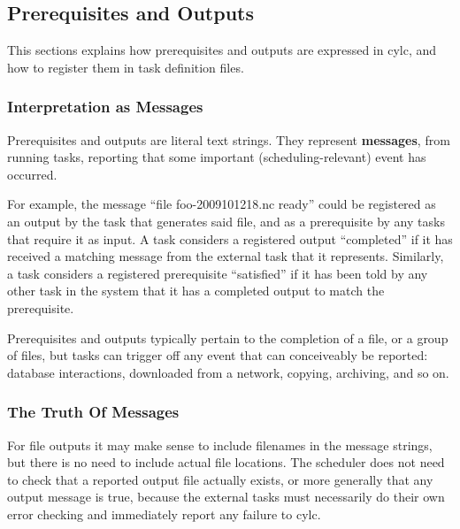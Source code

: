 \documentclass[11pt,a4paper]{article}
\begin{document}
\label{sec:requisites}
\subsection{Prerequisites and Outputs}


This sections explains how prerequisites and outputs are expressed in
cylc, and how to register them in task definition files.

\label{sec:requisiteasmessage}
\subsubsection{Interpretation as Messages}

\begin{shaded}
    Prerequisites and outputs are literal text strings. They
    represent {\bf messages}, from running tasks, reporting that some
    important (scheduling-relevant) event has occurred.
\end{shaded}

For example, the message ``file foo-2009101218.nc ready'' could be
registered as an output by the task that generates said file, and as a
prerequisite by any tasks that require it as input.  A task considers a
registered output ``completed'' if it has received a matching message
from the external task that it represents.  Similarly, a task considers
a registered prerequisite ``satisfied'' if it has been told by any other
task in the system that it has a completed output to match the
prerequisite. 

Prerequisites and outputs typically pertain to the completion of a file,
or a group of files, but tasks can trigger off any event that can
conceiveably be reported: database interactions, downloaded from a
network, copying, archiving, and so on.

\subsubsection{The Truth Of Messages}

For file outputs it may make sense to include filenames in the message
strings, but there is no need to include actual file locations. The
scheduler does not need to check that a reported output file actually
exists, or more generally that any output message is true, because the
external tasks must necessarily do their own error checking and
immediately report any failure to cylc.
\end{document}
